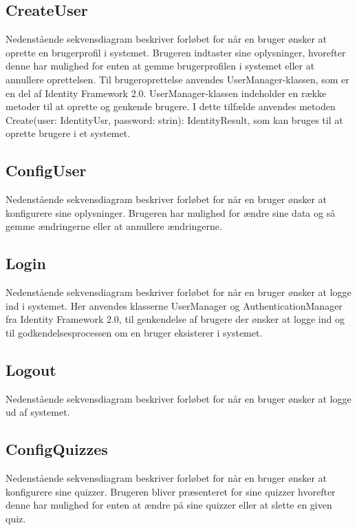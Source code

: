 \subsection*{CreateUser}
Nedenstående sekvensdiagram beskriver forløbet for når en bruger ønsker at oprette en brugerprofil i systemet. Brugeren indtaster sine oplysninger, hvorefter denne har mulighed for enten at gemme brugerprofilen i systemet eller at annullere oprettelsen. Til brugeroprettelse anvendes UserManager-klassen, som er en del af Identity Framework 2.0. UserManager-klassen indeholder en række metoder til at oprette og genkende brugere. I dette tilfælde anvendes metoden Create(user: IdentityUsr, password: strin): IdentityResult, som kan bruges til at oprette brugere i et systemet.


\subsection*{ConfigUser}
Nedenstående sekvensdiagram beskriver forløbet for når en bruger ønsker at konfigurere sine oplysninger. Brugeren har mulighed for ændre sine data og så gemme ændringerne eller at annullere ændringerne.


\subsection*{Login}
Nedenstående sekvensdiagram beskriver forløbet for når en bruger ønsker at logge ind i systemet. Her anvendes klasserne UserManager og AuthenticationManager fra Identity Framework 2.0, til genkendelse af brugere der ønsker at logge ind og til godkendelsesprocessen om en bruger eksisterer i systemet.


\subsection*{Logout}
Nedenstående sekvensdiagram beskriver forløbet for når en bruger ønsker at logge ud af systemet.


\subsection*{ConfigQuizzes}
Nedenstående sekvensdiagram beskriver forløbet for når en bruger ønsker at konfigurere sine quizzer. Brugeren bliver præsenteret for sine quizzer hvorefter denne har mulighed for enten at ændre på sine quizzer eller at slette en given quiz.

